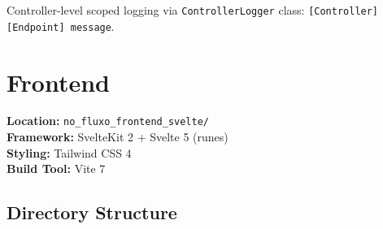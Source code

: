 \documentclass[11pt,a4paper]{article}
\newcommand{\code}[1]{\texttt{#1}}
\begin{document}
Controller-level scoped logging via \code{ControllerLogger} class:
\code{[Controller][Endpoint] message}.

\section{Frontend}

\noindent\textbf{Location:} \code{no\_fluxo\_frontend\_svelte/}\\
\textbf{Framework:} SvelteKit 2 + Svelte 5 (runes)\\
\textbf{Styling:} Tailwind CSS 4\\
\textbf{Build Tool:} Vite 7

\subsection{Directory Structure}
\end{document}
